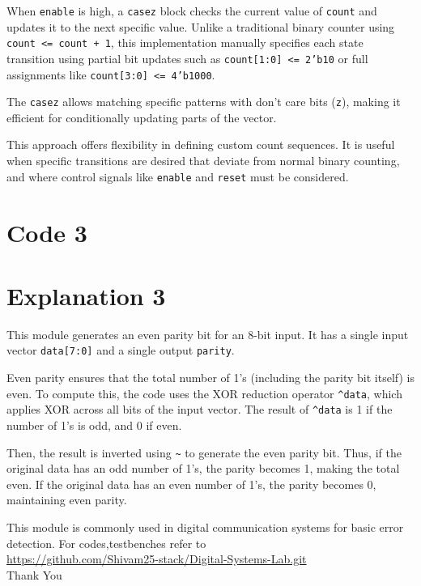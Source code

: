 \documentclass{article}
\begin{document}
When \texttt{enable} is high, a \texttt{casez} block checks the current value of \texttt{count} and updates it to the next specific value. Unlike a traditional binary counter using \texttt{count <= count + 1}, this implementation manually specifies each state transition using partial bit updates such as \texttt{count[1:0] <= 2'b10} or full assignments like \texttt{count[3:0] <= 4'b1000}.

The \texttt{casez} allows matching specific patterns with don’t care bits (\texttt{z}), making it efficient for conditionally updating parts of the vector.

This approach offers flexibility in defining custom count sequences. It is useful when specific transitions are desired that deviate from normal binary counting, and where control signals like \texttt{enable} and \texttt{reset} must be considered.


\section*{Code 3}


\section*{Explanation 3}

This module generates an even parity bit for an 8-bit input. It has a single input vector \texttt{data[7:0]} and a single output \texttt{parity}.

Even parity ensures that the total number of 1's (including the parity bit itself) is even. To compute this, the code uses the XOR reduction operator \texttt{\^{}data}, which applies XOR across all bits of the input vector. The result of \texttt{\^{}data} is 1 if the number of 1's is odd, and 0 if even.

Then, the result is inverted using \texttt{\~{}} to generate the even parity bit. Thus, if the original data has an odd number of 1's, the parity becomes 1, making the total even. If the original data has an even number of 1's, the parity becomes 0, maintaining even parity.

This module is commonly used in digital communication systems for basic error detection.
For codes,testbenches refer to \\
\url{https://github.com/Shivam25-stack/Digital-Systems-Lab.git}
\\

\centering
Thank You
\end{document}
